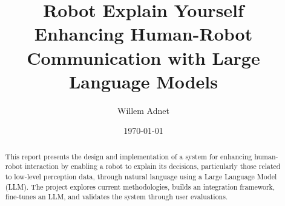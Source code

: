 \documentclass[11pt,a4paper]{article}
\begin{document}
\title{Robot Explain Yourself\\
Enhancing Human-Robot Communication with Large Language Models}
\author{Willem Adnet}
\date{\today}
\maketitle

\begin{abstract}
This report presents the design and implementation of a system for enhancing human-robot interaction by enabling a robot to explain its decisions, particularly those related to low-level perception data, through natural language using a Large Language Model (LLM).
The project explores current methodologies, builds an integration framework, fine-tunes an LLM, and validates the system through user evaluations.
\end{abstract}

\tableofcontents
\newpage











\end{document}
